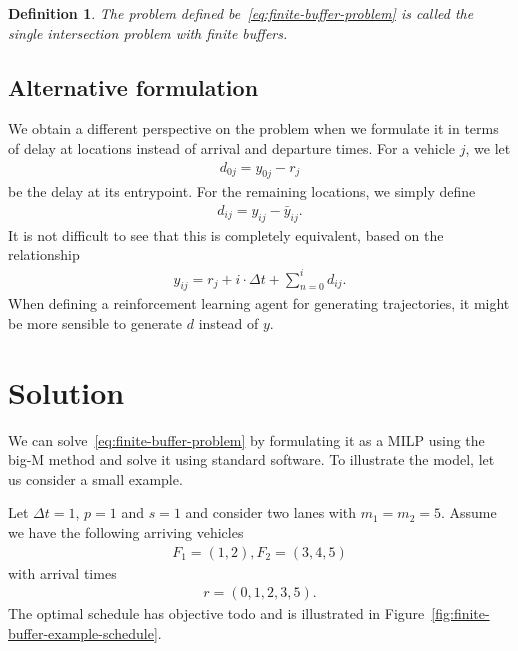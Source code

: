 \documentclass{article}
\theoremstyle{definition}
\theoremstyle{plain}
\newtheorem{define}{Definition}[section]
\begin{document}
\begin{define}
  \label{def:finite-buffer-problem}
  The problem defined be~\eqref{eq:finite-buffer-problem} is called the
  {\normalfont single intersection problem with finite buffers}.
\end{define}

\subsection{Alternative formulation}

We obtain a different perspective on the problem when we formulate it in terms of delay at locations instead of arrival and departure times.
For a vehicle $j$, we let
\begin{align*}
  d_{0j} = y_{0j} - r_{j}
\end{align*}
be the delay at its entrypoint.
For the remaining locations, we simply define
\begin{align*}
  d_{ij} = y_{ij} - \bar{y}_{ij} .
\end{align*}
It is not difficult to see that this is completely equivalent, based on the relationship
\begin{align}
  y_{ij} = r_{j} + i \cdot \Delta t + \sum_{n=0}^{i} d_{ij} .
\end{align}
When defining a reinforcement learning agent for generating trajectories, it
might be more sensible to generate $d$ instead of $y$.


\section{Solution}

We can solve~\eqref{eq:finite-buffer-problem} by formulating it as a MILP using
the big-M method and solve it using standard software. To illustrate the model,
let us consider a small example.

\begin{eg}
  \label{eg:finite-buffers}
  Let $\Delta t = 1$, $p = 1$ and $s = 1$ and consider two lanes with
  $m_{1} = m_{2} = 5$. Assume we have the following arriving vehicles
  \begin{align*}
    F_{1} = (1, 2) , F_{2} = (3, 4, 5)
  \end{align*}
  with arrival times
  \begin{align*}
    r = (0, 1, 2, 3, 5) .
  \end{align*}
  The optimal schedule has objective {\color{blue}todo} and is illustrated in
  Figure~\ref{fig:finite-buffer-example-schedule}.
\end{eg}
\end{document}
